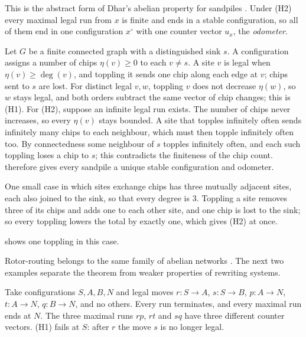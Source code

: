 This is the abstract form of Dhar's abelian property for sandpiles \citep{Dhar1990}. Under (H2)
every maximal legal run from $x$ is finite and ends in a stable configuration, so all of them end in
one configuration $x^\circ$ with one counter vector $u_x$, the \emph{odometer}.

\begin{example}[Sandpiles]\label{ex:G8-sandpile}
Let $G$ be a finite connected graph with a distinguished sink $s$. A configuration assigns a number
of chips $\eta(v) \ge 0$ to each $v \ne s$. A site $v$ is legal when $\eta(v) \ge \deg(v)$, and
toppling it sends one chip along each edge at $v$; chips sent to $s$ are lost. For distinct legal
$v, w$, toppling $v$ does not decrease $\eta(w)$, so $w$ stays legal, and both orders subtract the
same vector of chip changes; this is (H1). For (H2), suppose an infinite legal run exists. The
number of chips never increases, so every $\eta(v)$ stays bounded. A site that topples infinitely
often sends infinitely many chips to each neighbour, which must then topple infinitely often too.
By connectedness some neighbour of $s$ topples infinitely often, and each such toppling loses a chip
to $s$; this contradicts the finiteness of the chip count.  therefore gives every
sandpile a unique stable configuration and odometer.

One small case in which sites exchange chips has three mutually adjacent sites, each also
joined to the sink, so that every degree is $3$. Toppling a site removes three of its chips and adds
one to each other site, and one chip is lost to the sink; so every toppling lowers the total by
exactly one, which gives (H2) at once.
\end{example}

 shows one toppling in this case.



Rotor-routing belongs to the same family of abelian networks \citep{HolroydEtAl2008}. The next two
examples separate the theorem from weaker properties of rewriting systems.

\begin{example}\label{ex:G8-b}
Take configurations $S, A, B, N$ and legal moves $r : S \to A$, $s : S \to B$, $p : A \to N$,
$t : A \to N$, $q : B \to N$, and no others. Every run terminates, and every maximal run ends at $N$.
The three maximal runs $rp$, $rt$ and $sq$ have three different counter vectors. (H1) fails at
$S$: after $r$ the move $s$ is no longer legal.
\end{example}


